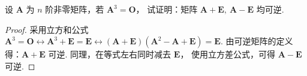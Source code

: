 \begin{problem}[本题6分]
  设 $\mathbf A$ 为 $n$ 阶非零矩阵，若 $\mathbf A^3 = \mathbf O$，
  试证明：矩阵 $\mathbf A + \mathbf E,~ \mathbf A - \mathbf E$ 均可逆.
\end{problem}
\scratch[10ex]
\begin{solution}
  \begin{proof}
    采用立方和公式 $\mathbf A^3 = \mathbf O\longleftrightarrow
    \mathbf A^3 + \mathbf E = \mathbf E\longleftrightarrow
    (\mathbf A + \mathbf E)(\mathbf A^2 - \mathbf A + \mathbf E) = \mathbf E$.
    由可逆矩阵的定义得：$\mathbf A + \mathbf E$ 可逆.
    同理，在等式左右同时减去 $\mathbf E$，
    使用立方差公式，可得 $\mathbf A - \mathbf E$ 可逆.
  \end{proof}
\end{solution}